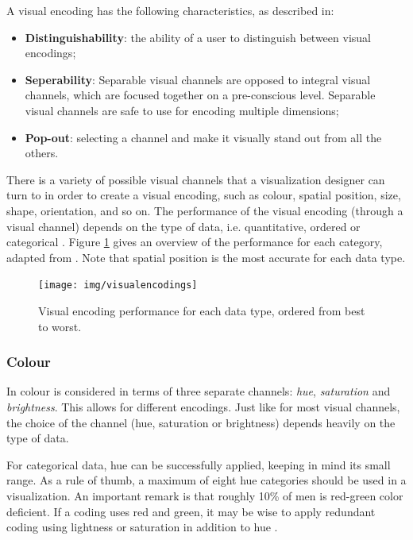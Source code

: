 A visual encoding has the following characteristics, as described in\cite{shirley:2009}:

\begin{itemize}
	\item \textbf{Distinguishability}: the ability of a user to distinguish between visual encodings;
	\item \textbf{Seperability}: Separable visual channels are opposed to integral visual channels, which are focused together on a pre-conscious level. Separable visual channels are safe to use for encoding multiple dimensions;
	\item \textbf{Pop-out}: selecting a channel and make it visually stand out from all the others.
\end{itemize}


There is a variety of possible visual channels that a visualization designer can turn to in order to create a visual encoding, such as colour, spatial position, size, shape, orientation, and so on. The performance of the visual encoding (through a visual channel) depends on the type of data, i.e. quantitative, ordered or categorical \cite{shirley:2009}. Figure \ref{figure:encodings} gives an overview of the performance for each category, adapted from \cite{shirley:2009}. Note that spatial position is the most accurate for each data type\cite{shirley:2009}.

\begin{figure}%
	\begin{center}
		\texttt{[image: img/visualencodings]}%
	\end{center}
	\caption{Visual encoding performance for each data type, ordered from best to worst.}%
	\label{figure:encodings}%
\end{figure}


\subsubsection{Colour}

In \cite{shirley:2009} colour is considered in terms of three separate channels: \emph{hue}, \emph{saturation} and \emph{brightness}. This allows for different encodings. Just like for most visual channels, the choice of the channel (hue, saturation or brightness) depends heavily on the type of data.

For categorical data, hue can be successfully applied, keeping in mind its small range. As a rule of thumb, a maximum of eight hue categories should be used in a visualization. An important remark is that roughly 10\% of men is red-green color deficient. If a coding uses red and green, it may be wise to apply redundant coding using lightness or saturation in addition to hue \cite{shirley:2009}.

